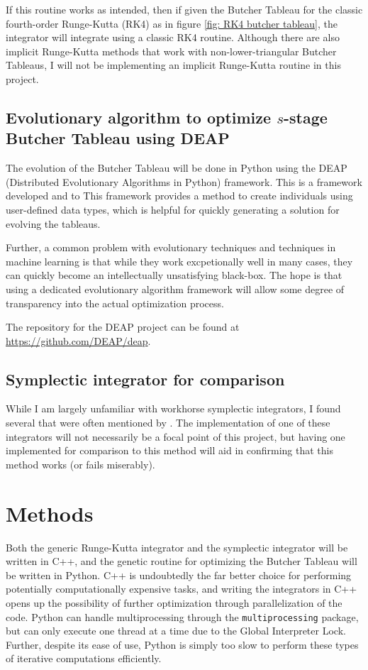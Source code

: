 \documentclass[onecolumn,titlepage,letterpaper,10pt]{article}
\begin{document}
If this routine works as intended, then if given the Butcher Tableau for the classic
fourth-order Runge-Kutta (RK4) as in figure \ref{fig: RK4 butcher tableau}, the
integrator will integrate using a classic RK4 routine. Although there are also
implicit Runge-Kutta methods that work with non-lower-triangular Butcher Tableaus,
I will not be implementing an
implicit Runge-Kutta routine in this project.


\subsection{Evolutionary algorithm to optimize $s$-stage Butcher Tableau using
    DEAP\cite{DEAP}}
The evolution of the Butcher Tableau will be done in Python using the DEAP
(Distributed Evolutionary Algorithms in Python) framework. This is a framework
developed  and to
\cite{DEAP} This framework
provides a method to create
individuals using user-defined data types, which is helpful for quickly
generating a solution for evolving the tableaus.

Further, a common problem with evolutionary techniques and techniques in machine
learning is that while they work excpetionally well in many cases, they can
quickly become an intellectually unsatisfying black-box. The hope is that using
a dedicated evolutionary algorithm framework will allow some degree of
transparency into the actual optimization process.

The repository for the DEAP project can be found at
\url{https://github.com/DEAP/deap}.

\subsection{Symplectic integrator for comparison}
While I am largely unfamiliar with workhorse symplectic integrators, I found
several that were often mentioned by \citep{geometric_numeric}. The
implementation of one of these integrators will not necessarily be a focal point
of this project, but having one implemented for comparison to this method
will aid in confirming that this method works (or fails miserably).

\section{Methods}
Both the generic Runge-Kutta integrator and the symplectic integrator will be
written in C++, and the genetic routine for optimizing the Butcher Tableau will
be written in Python. C++ is undoubtedly the far better choice for performing
potentially computationally expensive tasks, and writing the integrators in
C++ opens up the possibility of further optimization through parallelization of
the code. Python can handle multiprocessing through the \texttt{multiprocessing}
package, but can only execute one thread at a time due to the Global Interpreter
Lock. Further, despite its ease of use, Python is simply too slow to perform
these types of iterative computations efficiently.
\end{document}
